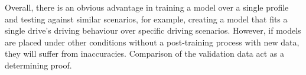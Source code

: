%
%
%
%
%
%
%
%
%
%
%
%
% 
%
%
Overall, there is an obvious advantage in training a model over a single profile and testing against similar scenarios, for example, creating a model that fits a single drive's driving behaviour over specific driving scenarios.
However, if models are placed under other conditions without a post-training process with new data, they will suffer from inaccuracies.
Comparison of the validation data act as a determining proof.
